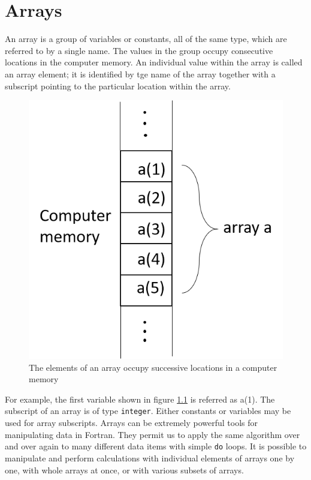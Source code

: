 \documentclass[12pt,oneside]{book}
\newcommand{\code}[1]{\lstinline[keywordstyle=\color{black},basicstyle=\ttfamily]{#1}}
\begin{document}
    \chapter{Arrays}
    An array is a group of variables or constants, all of the same type, which are referred to by a single name. The values in the group occupy consecutive locations in the computer memory. An individual value within the array is called an array element; it is identified by tge name of the array together with a subscript pointing to the particular location within the array.
    \begin{figure}[H]
        \centering
        \includegraphics[scale=.75]{Picture1.png}
        \caption{The elements of an array occupy successive locations in a computer memory}
        \label{fig:array}
    \end{figure}
    For example, the first variable shown in figure \ref{fig:array} is referred as a(1). The subscript of an array is of type \code{integer}. Either constants or variables may be used for array subscripts. Arrays can be extremely powerful tools for manipulating data in Fortran. They permit us to apply the same algorithm over and over again to many different data items with simple \code{do} loops. It is possible to manipulate and perform calculations with individual elements of arrays one by one, with whole arrays at once, or with various subsets of arrays.\\
\end{document}
